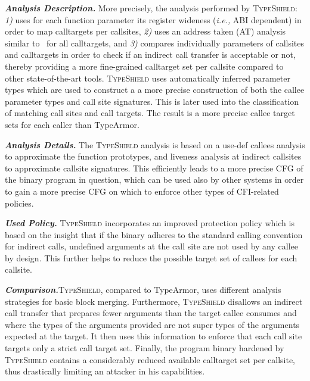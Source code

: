 \textbf{\textit{Analysis Description.}} More precisely, the analysis performed by \textsc{TypeShield}:
\textit{1)} uses for each function parameter its register wideness (\textit{i.e.,} ABI dependent) in order to map calltargets per callsites,  
\textit{2)} uses an address taken (AT) analysis similar to~\cite{veen:typearmor} for all calltargets, and 
\textit{3)} compares individually parameters of callsites and calltargets in order to check if an indirect call transfer is acceptable or not, 
thereby providing a more fine-grained calltarget set per callsite compared to other state-of-the-art tools.
\textsc{TypeShield} uses automatically inferred parameter types which are used to construct a 
a more precise construction of both the callee parameter types and call site signatures. This 
is later used into the classification of matching call sites and call targets.
The result is a more precise callee target sets for each caller than TypeArmor.

\textbf{\textit{Analysis Details.}} The \textsc{TypeShield} analysis is based on a use-def callees analysis to approximate the function prototypes, 
and liveness analysis at indirect callsites to approximate callsite signatures. This 
efficiently leads to a more precise CFG of the binary program in question, 
which can be used also by other systems in order to gain a more precise CFG on which to 
enforce other types of CFI-related policies.

\textbf{\textit{Used Policy.}} \textsc{TypeShield} incorporates an improved protection policy which is
based on the insight that if the binary adheres to the standard calling convention
for indirect calls, undefined arguments at the call site are not used by any callee by design. 
This further helps to reduce the possible target set of callees for each callsite.

\textbf{\textit{Comparison.}}\textsc{TypeShield}, compared to TypeArmor, uses different analysis strategies for basic block merging.
Furthermore, \textsc{TypeShield} disallows an indirect call transfer that prepares
fewer arguments than the target callee consumes and where the types of the 
arguments provided are not super types of the arguments expected at the target.
It then uses this information to enforce that each call site targets only a strict call target set.
Finally, the program binary hardened by \textsc{TypeShield} contains a considerably reduced available calltarget set per callsite,
thus drastically limiting an attacker in his capabilities.

